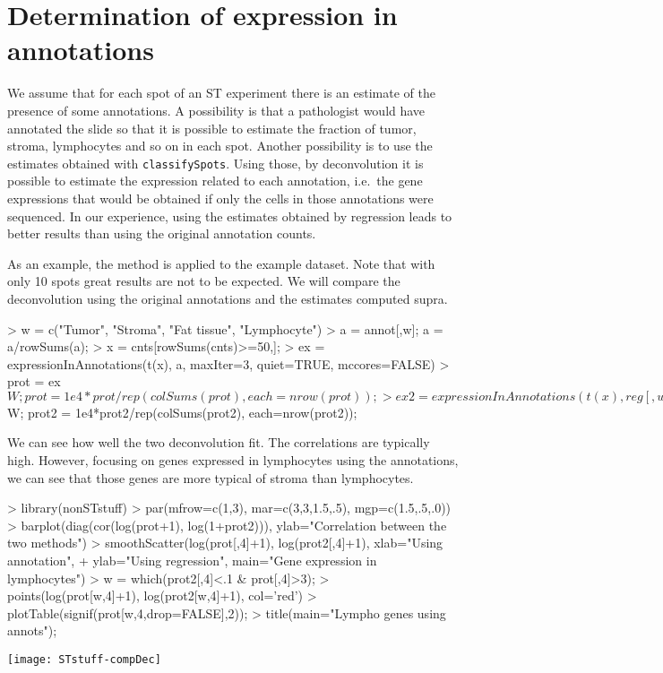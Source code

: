 \documentclass{article}
\begin{document}
\section{Determination of expression in annotations}
We assume that for each spot of an ST experiment there is an estimate of the presence of some annotations. A possibility is that a pathologist would have annotated the slide so that it is possible to estimate the fraction of tumor, stroma, lymphocytes and so on in each spot. Another possibility is to use the estimates obtained with \verb!classifySpots!.  Using those, by deconvolution it is possible to estimate the expression related to each annotation, i.e.\ the gene expressions that would be obtained if only the cells in those annotations were sequenced. In our experience, using the estimates obtained by regression leads to better results than using the original annotation counts.

As an example, the method is applied to the example dataset. Note that with only 10 spots great results are not to be expected. We will compare the deconvolution using the original annotations and the estimates computed supra.

\begin{Schunk}
\begin{Sinput}
> w = c("Tumor", "Stroma", "Fat tissue", "Lymphocyte")
> a = annot[,w]; a = a/rowSums(a);
> x = cnts[rowSums(cnts)>=50,];
> ex = expressionInAnnotations(t(x), a, maxIter=3, quiet=TRUE, mccores=FALSE)
> prot = ex$W; prot = 1e4*prot/rep(colSums(prot), each=nrow(prot));
> ex2 = expressionInAnnotations(t(x), reg[,w], maxIter=3, quiet=TRUE, mccores=FALSE)
> prot2 = ex2$W; prot2 = 1e4*prot2/rep(colSums(prot2), each=nrow(prot2));
\end{Sinput}
\end{Schunk}

We can see how well the two deconvolution fit. The correlations are typically high. However, focusing on genes expressed in lymphocytes using the annotations, we can see that those genes are more typical of stroma than lymphocytes.

\begin{Schunk}
\begin{Sinput}
> library(nonSTstuff)
> par(mfrow=c(1,3), mar=c(3,3,1.5,.5), mgp=c(1.5,.5,.0))
> barplot(diag(cor(log(prot+1), log(1+prot2))), ylab="Correlation between the two methods")
> smoothScatter(log(prot[,4]+1), log(prot2[,4]+1), xlab="Using annotation",
+   ylab="Using regression", main="Gene expression in lymphocytes")
> w = which(prot2[,4]<.1 & prot[,4]>3);
> points(log(prot[w,4]+1), log(prot2[w,4]+1), col='red')
> plotTable(signif(prot[w,4,drop=FALSE],2));
> title(main="Lympho genes using annots");
\end{Sinput}
\end{Schunk}
\texttt{[image: STstuff-compDec]}
\end{document}

